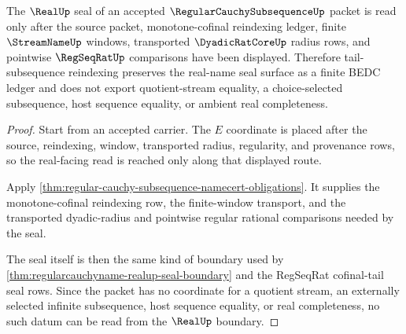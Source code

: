\begin{theorem}
\label{thm:regular-cauchy-subsequence-real-seal-boundary}
The $\RealUp$ seal of an accepted $\RegularCauchySubsequenceUp$ packet is read only after the source packet, monotone-cofinal reindexing ledger, finite $\StreamNameUp$ windows, transported $\DyadicRatCoreUp$ radius rows, and pointwise $\RegSeqRatUp$ comparisons have been displayed. Therefore tail-subsequence reindexing preserves the real-name seal surface as a finite BEDC ledger and does not export quotient-stream equality, a choice-selected subsequence, host sequence equality, or ambient real completeness.
\end{theorem}
\begin{proof}
Start from an accepted carrier. The $E$ coordinate is placed after the source, reindexing, window, transported radius, regularity, and provenance rows, so the real-facing read is reached only along that displayed route.

Apply \autoref{thm:regular-cauchy-subsequence-namecert-obligations}. It supplies the monotone-cofinal reindexing row, the finite-window transport, and the transported dyadic-radius and pointwise regular rational comparisons needed by the seal.

The seal itself is then the same kind of boundary used by \autoref{thm:regularcauchyname-realup-seal-boundary} and the RegSeqRat cofinal-tail seal rows. Since the packet has no coordinate for a quotient stream, an externally selected infinite subsequence, host sequence equality, or real completeness, no such datum can be read from the $\RealUp$ boundary.
\end{proof}

